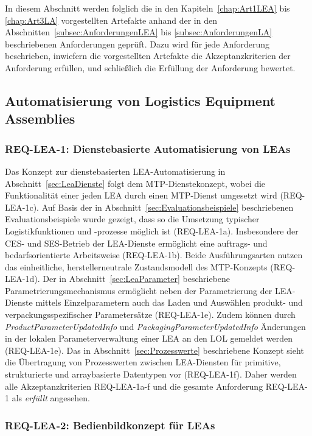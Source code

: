 In diesem Abschnitt werden folglich die in den Kapiteln~\ref{chap:Art1LEA} bis \ref{chap:Art3LA} vorgestellten Artefakte anhand der in den Abschnitten~\ref{subsec:AnforderungenLEA} bis \ref{subsec:AnforderungenLA} beschriebenen Anforderungen geprüft. Dazu wird für jede Anforderung beschrieben, inwiefern die vorgestellten Artefakte die Akzeptanzkriterien der Anforderung erfüllen, und schließlich die Erfüllung der Anforderung bewertet.

\subsection{Automatisierung von Logistics Equipment Assemblies}

\subsubsection{REQ-LEA-1: Dienstebasierte Automatisierung von LEAs}

Das Konzept zur dienstebasierten LEA-Automatisierung in Abschnitt~\ref{sec:LeaDienste} folgt dem MTP-Dienstekonzept, wobei die Funktionalität einer jeden LEA durch einen MTP-Dienst umgesetzt wird (REQ-LEA-1c). Auf Basis der in Abschnitt~\ref{sec:Evaluationsbeispiele} beschriebenen Evaluationsbeispiele wurde gezeigt, dass so die Umsetzung typischer Logistikfunktionen und -prozesse möglich ist (REQ-LEA-1a). Insbesondere der CES- und SES-Betrieb der LEA-Dienste ermöglicht eine auftrags- und bedarfsorientierte Arbeitsweise (REQ-LEA-1b). Beide Ausführungsarten nutzen das einheitliche, herstellerneutrale Zustandsmodell des MTP-Konzepts (REQ-LEA-1d). Der in Abschnitt~\ref{sec:LeaParameter} beschriebene Parametrierungsmechanismus ermöglicht neben der Parametrierung der LEA-Dienste mittels Einzelparametern auch das Laden und Auswählen produkt- und verpackungsspezifischer Parametersätze (REQ-LEA-1e). Zudem können durch \emph{ProductParameterUpdatedInfo} und \emph{PackagingParameterUpdatedInfo} Änderungen in der lokalen Parameterverwaltung einer LEA an den LOL gemeldet werden (REQ-LEA-1e). Das in Abschnitt~\ref{sec:Prozesswerte} beschriebene Konzept sieht die Übertragung von Prozesswerten zwischen LEA-Diensten für primitive, strukturierte und arraybasierte Datentypen vor (REQ-LEA-1f). Daher werden alle Akzeptanzkriterien REQ-LEA-1a-f und die gesamte Anforderung REQ-LEA-1 als \emph{erfüllt} angesehen.

\subsubsection{REQ-LEA-2: Bedienbildkonzept für LEAs}

